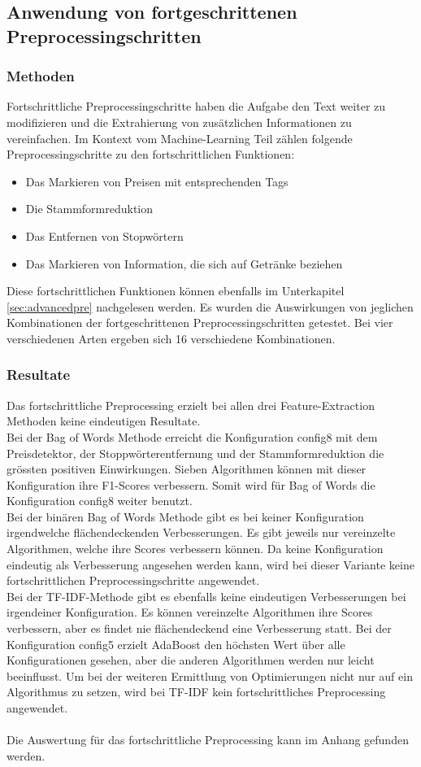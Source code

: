 \subsection{Anwendung von fortgeschrittenen Preprocessingschritten}
\subsubsection{Methoden}
Fortschrittliche Preprocessingschritte haben die Aufgabe den Text weiter zu modifizieren und die Extrahierung von zusätzlichen Informationen zu vereinfachen.
Im Kontext vom Machine-Learning Teil zählen folgende Preprocessingschritte zu den fortschrittlichen Funktionen:
\begin{itemize}
	\item Das Markieren von Preisen mit entsprechenden Tags
	\item Die Stammformreduktion
	\item Das Entfernen von Stopwörtern
	\item Das Markieren von Information, die sich auf Getränke beziehen
\end{itemize}
Diese fortschrittlichen Funktionen können ebenfalls im Unterkapitel \ref{sec:advancedpre} nachgelesen werden.
Es wurden die Auswirkungen von jeglichen Kombinationen der fortgeschrittenen Preprocessingschritten getestet.
Bei vier verschiedenen Arten ergeben sich 16 verschiedene Kombinationen.
\subsubsection{Resultate}
Das fortschrittliche Preprocessing erzielt bei allen drei Feature-Extraction Methoden keine eindeutigen Resultate.\\
Bei der \glqq Bag of Words\grqq{} Methode erreicht die Konfiguration \glqq config8\grqq{} mit dem Preisdetektor, der Stoppwörterentfernung und der Stammformreduktion die grössten positiven Einwirkungen.
Sieben Algorithmen können mit dieser Konfiguration ihre F1-Scores verbessern.
Somit wird für \glqq Bag of Words\grqq{} die Konfiguration \glqq config8\grqq{} weiter benutzt.\\
Bei der binären \glqq Bag of Words\grqq{} Methode gibt es bei keiner Konfiguration irgendwelche flächendeckenden Verbesserungen.
Es gibt jeweils nur vereinzelte Algorithmen, welche ihre Scores verbessern können.
Da keine Konfiguration eindeutig als Verbesserung angesehen werden kann, wird bei dieser Variante keine fortschrittlichen Preprocessingschritte angewendet.\\
Bei der TF-IDF-Methode gibt es ebenfalls keine eindeutigen Verbesserungen bei irgendeiner Konfiguration.
Es können vereinzelte Algorithmen ihre Scores verbessern, aber es findet nie flächendeckend eine Verbesserung statt.
Bei der Konfiguration \glqq config5\grqq{} erzielt AdaBoost den höchsten Wert über alle Konfigurationen gesehen, aber die anderen Algorithmen werden nur leicht beeinflusst.
Um bei der weiteren Ermittlung von Optimierungen nicht nur auf ein Algorithmus zu setzen, wird bei TF-IDF kein fortschrittliches Preprocessing angewendet.
\\\\
Die Auswertung für das fortschrittliche Preprocessing kann im Anhang gefunden werden.
